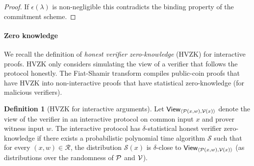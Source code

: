 \documentclass{article}
\theoremstyle{definition}
\newtheorem{definition}{Definition}
\newcommand{\ben}[1]{{\textcolor{red}{[\bf Ben: #1]}}}
\newcommand{\ben}[1]{}
\begin{document}
\begin{proof}
If $\epsilon(\lambda)$ is non-negligible this contradicts the binding property of the commitment scheme.  
\end{proof} 


\paragraph{Zero knowledge} We recall the definition of \emph{honest verifier zero-knowledge} (HVZK) for interactive proofs. HVZK only considers simulating the view of a verifier that follows the protocol honestly. The Fiat-Shamir transform compiles public-coin proofs that have HVZK into non-interactive proofs that have statistical zero-knowledge (for malicious verifiers). 

\begin{definition}[HVZK for interactive arguments]
\label{def:hvzk}
Let $\textsf{View}_{\langle \mathcal{P}(x, w), \mathcal{V}(x) \rangle}$ denote the view of the verifier in an interactive protocol on common input $x$ and prover witness input $w$. The interactive protocol has $\delta$-statistical honest verifier zero-knowledge if there exists a probabilistic polynomial time algorithm $\mathcal{S}$ such that for every $(x, w) \in \mathcal{R}$, the distribution $\mathcal{S}(x)$ is $\delta$-close to $\textsf{View}_{\langle \mathcal{P}(x, w), \mathcal{V}(x) \rangle}$ (as distributions over the randomness of $\mathcal{P}$ and $\mathcal{V}$).
\end{definition}
\end{document}
